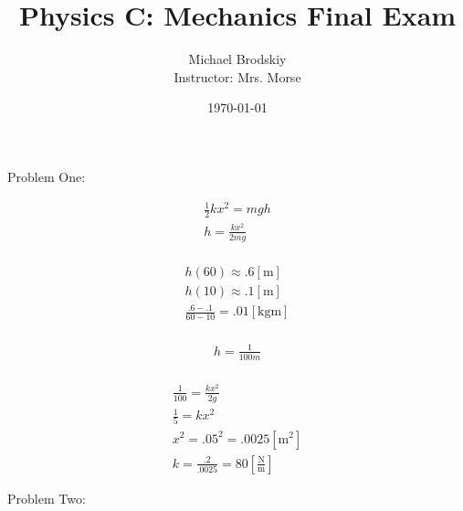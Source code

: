 \documentclass[12pt]{article}
\title{Physics C: Mechanics Final Exam}
\date{\today}
\author{Michael Brodskiy\\ \small Instructor: Mrs. Morse}
\begin{document}
\maketitle

\begin{center}
  Problem One:
\end{center}
    \hline

    \begin{equation}
      \begin{split}
        \frac{1}{2}kx^2=mgh\\
        h=\frac{kx^2}{2mg}\\
      \end{split}
      \label{1}
    \end{equation}

    \begin{equation}
      \begin{split}
        h(60)\approx.6[\si{\meter}]\\
        h(10)\approx.1[\si{\meter}]\\
        \frac{.6-.1}{60-10}=.01[\si{\kilo\gram\meter}]\\
      \end{split}
      \label{2}
    \end{equation}

    \begin{equation}
      \begin{split}
        h=\frac{1}{100m}\\
      \end{split}
      \label{3}
    \end{equation}

    \begin{equation}
      \begin{split}
        \frac{1}{100}=\frac{kx^2}{2g}\\
        \frac{1}{5}=kx^2\\
        x^2=.05^2=.0025[\si{\meter\squared}]\\
        k=\frac{.2}{.0025}=80\left[ \frac{\si{\newton}}{\si{\meter}} \right]
      \end{split}
      \label{4}
    \end{equation}

    \hline

    \newpage

\begin{center}
  Problem Two:
\end{center}
    \hline
    
\end{document}
